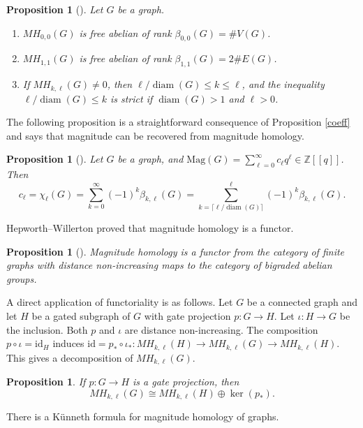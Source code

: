 \documentclass{amsart}
\numberwithin{equation}{section}
\newtheorem{prop}[thm]{Proposition}
\theoremstyle{plain}
\theoremstyle{remark}
\theoremstyle{definition}
\numberwithin{equation}{section}
\newcommand{\Z}{\mathbb{Z}}
\newcommand{\id}{\text{id}}
\newcommand{\Mag}{\mathrm{Mag}}
\DeclareMathOperator{\diam}{diam}
\begin{document}
\begin{prop}[{\cite[Propositions 2.9 and 2.10]{Hepworth2017}}]\label{lowdeg}
    Let $G$ be a graph. 
    \begin{enumerate}
        \item $MH_{0,0}(G)$ is free abelian of rank $\beta_{0,0}(G)=\#V(G)$.
        \item $MH_{1,1}(G)$ is free abelian of rank $\beta_{1,1}(G)=2\#E(G)$.
        \item If $MH_{k,\ell}(G)\neq 0$, then $\ell/\diam(G)\leq k\leq\ell$, and the inequality $\ell/\diam(G)\leq k$ is strict if $\diam(G)>1$ and $\ell>0$.
    \end{enumerate}
\end{prop}

The following proposition is a straightforward consequence of Proposition \ref{coeff} and says that magnitude can be recovered from magnitude homology.

\begin{prop}[{\cite[Theorem 2.8]{Hepworth2017}}]
    Let $G$ be a graph, and $\Mag(G)=\sum_{\ell=0}^{\infty}c_{\ell}q^{\ell}\in\Z[\![q]\!]$. Then
    \[
    c_{\ell}=\chi_{\ell}(G)=\sum_{k=0}^{\infty}(-1)^k\beta_{k,\ell}(G)=\sum_{k=\lceil \ell/\diam(G)\rceil}^{\ell}(-1)^k\beta_{k,\ell}(G).
    \]
\end{prop}

Hepworth--Willerton proved that magnitude homology is a functor.

\begin{prop}[{\cite[Proposition 3.3]{Hepworth2017}}]\label{functor}
    Magnitude homology is a functor from the category of finite graphs with distance non-increasing maps to the category of bigraded abelian groups.
\end{prop}

A direct application of functoriality is as follows. Let $G$ be a connected graph and let $H$ be a gated subgraph of $G$ with gate projection $p:G\to H$. Let $\iota:H\to G$ be the inclusion. Both $p$ and $\iota$ are distance non-increasing. The composition $p\circ\iota=\id_{H}$ induces $\id=p_*\circ\iota_*:MH_{k,\ell}(H)\to MH_{k,\ell}(G)\to MH_{k,\ell}(H)$. This gives a decomposition of $MH_{k,\ell}(G)$.
\begin{prop}\label{gateddecomp}
    If $p:G\to H$ is a gate projection, then
    \[
    MH_{k,\ell}(G)\cong MH_{k,\ell}(H)\oplus \ker(p_*).
    \]
\end{prop}


There is a K\"unneth formula for magnitude homology of graphs.
\end{document}
